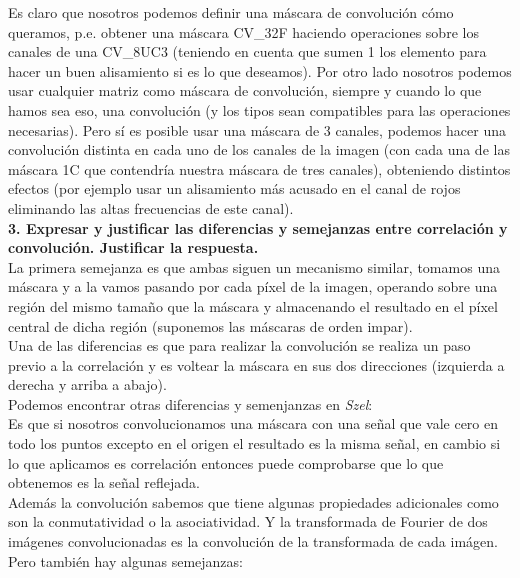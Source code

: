 \documentclass[10pt,a4paper]{article}
\begin{document}
Es claro que nosotros podemos definir una máscara de convolución cómo queramos, p.e. obtener una máscara CV\_32F haciendo operaciones sobre los canales de una CV\_8UC3 (teniendo en cuenta que sumen 1 los elemento para hacer un buen alisamiento si es lo que deseamos). Por otro lado nosotros podemos usar cualquier matriz como máscara de convolución, siempre y cuando lo que hamos sea eso, una convolución (y los tipos sean compatibles para las operaciones necesarias). Pero sí es posible usar una máscara de 3 canales, podemos hacer una convolución distinta en cada uno de los canales de la imagen (con cada una de las máscara 1C que contendría nuestra máscara de tres canales), obteniendo distintos efectos (por ejemplo usar un alisamiento más acusado en el canal de rojos eliminando las altas frecuencias de este canal).\\

\textbf{3. Expresar y justificar las diferencias y semejanzas entre correlación y convolución. Justificar la respuesta.}\\

La primera semejanza es que ambas siguen un mecanismo similar, tomamos una máscara y a la vamos pasando por cada píxel de la imagen, operando sobre una región del mismo tamaño que la máscara y almacenando el resultado en el píxel central de dicha región (suponemos las máscaras de orden impar).\\

Una de las diferencias es que para realizar la convolución se realiza un paso previo a la correlación y es voltear la máscara en sus dos direcciones (izquierda a derecha y arriba a abajo).\\

Podemos encontrar otras diferencias y semenjanzas en \textit{Szel}:\\

Es que si nosotros convolucionamos una máscara con una señal que vale cero en todo los puntos excepto en el origen el resultado es la misma señal, en cambio si lo que aplicamos es correlación entonces puede comprobarse que lo que obtenemos es la señal reflejada.\\

Además la convolución sabemos que tiene algunas propiedades adicionales como son la conmutatividad o la asociatividad. Y la transformada de Fourier de dos imágenes convolucionadas es la convolución de la transformada de cada imágen.\\

Pero también hay algunas semejanzas:\\
\end{document}
